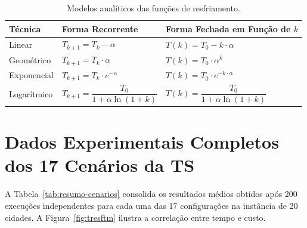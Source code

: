 \documentclass[11pt]{article}
\begin{document}
\begin{table}[H]
\centering
\caption{Modelos analíticos das funções de resfriamento.}
\label{tb:resf}
\renewcommand{\arraystretch}{1.4}
\begin{tabular}{lll}
\toprule
\textbf{Técnica} & \textbf{Forma Recorrente} & \textbf{Forma Fechada em Função de $k$} \\ 
\midrule
Linear       & $T_{k+1} = T_k - \alpha$           & $T(k) = T_0 - k \cdot \alpha$ \\
Geométrico   & $T_{k+1} = T_k \cdot \alpha$       & $T(k) = T_0 \cdot \alpha^k$ \\
Exponencial  & $T_{k+1} = T_k \cdot e^{-\alpha}$  & $T(k) = T_0 \cdot e^{-k \cdot \alpha}$ \\
Logarítmico  & $T_{k+1} = \dfrac{T_0}{1 + \alpha \ln(1 + k)}$ & $T(k) = \dfrac{T_0}{1 + \alpha \ln(1 + k)}$ \\
\bottomrule
\end{tabular}
\end{table}

\section{Dados Experimentais Completos dos 17 Cenários da TS} \label{ap:cenarios-ts}

A Tabela~\ref{tab:resumo-cenarios} consolida os resultados médios obtidos após 200 execuções independentes para cada uma das 17 configurações na instância de 20 cidades. A Figura~\ref{fig:tresftm} ilustra a correlação entre tempo e custo.
\end{document}
